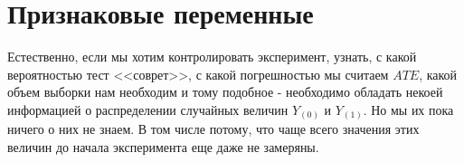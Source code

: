 %
%
%
%
%


    \section*{Признаковые переменные}

        Естественно, если мы хотим контролировать эксперимент, узнать, с какой вероятностью тест <<соврет>>, с какой погрешностью мы считаем $ATE$,
        какой объем выборки нам необходим и тому подобное - необходимо обладать некоей информацией о распределении случайных величин $Y_{(0)}$ и $Y_{(1)}$.
        Но мы их пока ничего о них не знаем.
        В том числе потому, что чаще всего значения этих величин до начала эксперимента еще даже не замеряны.

